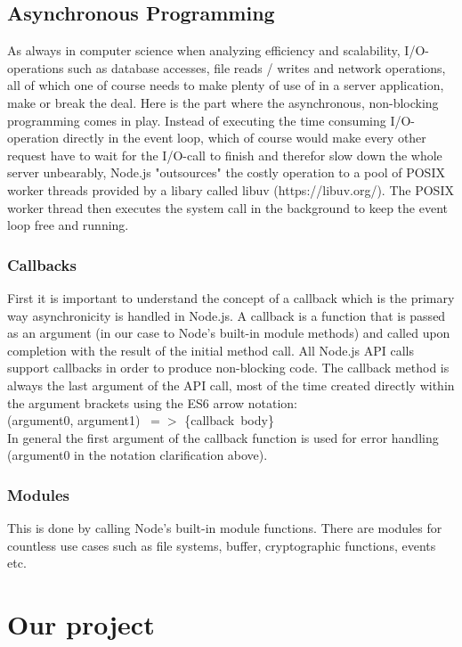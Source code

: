 \documentclass{bioinfo}
\begin{document}
\subsection{Asynchronous Programming}
As always in computer science when analyzing efficiency and scalability, I/O-operations such as database accesses, file reads / writes and network operations, all of which one of course needs to make plenty of use of in a server application, make or break the deal. Here is the part where the asynchronous, non-blocking programming comes in play. Instead of executing the time consuming I/O-operation directly in the event loop, which of course would make every other request have to wait for the I/O-call to finish and therefor slow down the whole server unbearably, Node.js "outsources" the costly operation to a pool of POSIX worker threads provided by a libary called libuv (https://libuv.org/). The POSIX worker thread then executes the system call in the background to keep the event loop free and running.

\subsubsection{Callbacks}
First it is important to understand the concept of a callback which is the primary way asynchronicity is handled in Node.js. A callback is a function that is passed as an argument (in our case to Node's built-in module methods) and called upon completion with the result of the initial method call. All Node.js API calls support callbacks in order to produce non-blocking code. The callback method is always the last argument of the API call, most of the time created directly within the argument brackets using the ES6 arrow notation: \\(argument0, argument1) $\ =>$ \{callback\ body\}\\
In general the first argument of the callback function is used for error handling (argument0 in the notation clarification above).

\subsubsection{Modules}

This is done by calling Node's built-in module functions. There are modules for countless use cases such as file systems, buffer, cryptographic functions, events etc. 

\section{Our project}
\end{document}
